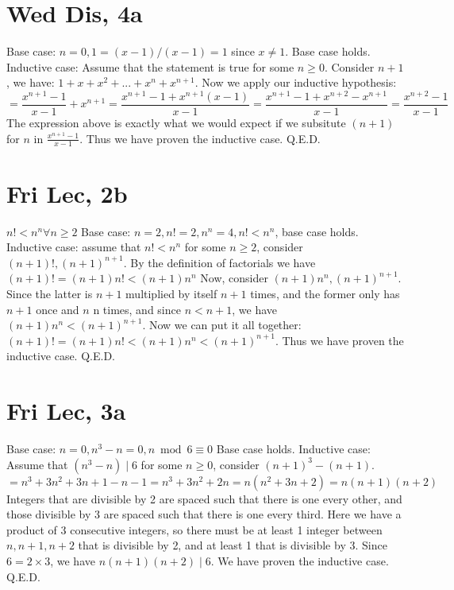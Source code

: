 \documentclass[12pt]{article}
\begin{document}
\section{Wed Dis, 4a}
Base case: $n = 0, 1 = (x-1)/(x-1) = 1$ since $x \neq 1$. Base case holds.
\newline
Inductive case: Assume that the statement is true for some $n \geq 0$. Consider $n+1$, we have: $1 + x + x^2 + ... + x^n + x^{n+1}$. Now we apply our inductive hypothesis:
$$= \frac{x^{n+1}-1}{x-1} + x^{n+1} = \frac{x^{n+1}-1+x^{n+1}(x-1)}{x-1} = \frac{x^{n+1}-1+x^{n+2}-x^{n+1}}{x-1} = \frac{x^{n+2}-1}{x-1}$$
The expression above is exactly what we would expect if we subsitute $(n+1)$ for $n$ in $\frac{x^{n+1}-1}{x-1}$. Thus we have proven the inductive case. Q.E.D.
\newpage


\section{Fri Lec, 2b}
$n! < n^n \forall n \geq 2$
\newline
Base case: $n=2, n!=2, n^n=4, n! < n^n$, base case holds.
\newline
Inductive case: assume that $n! < n^n$ for some $n \geq 2$, consider $(n+1)!, (n+1)^{n+1}$. By the definition of factorials we have $(n+1)! = (n+1)n! < (n+1)n^n$
\newline
Now, consider $(n+1)n^n, (n+1)^{n+1}$. Since the latter is $n+1$ multiplied by itself $n+1$ times, and the former only has $n+1$ once and $n$ n times, and since $n<n+1$, we have $(n+1)n^n < (n+1)^{n+1}$.
\newline
Now we can put it all together: $(n+1)! = (n+1)n! < (n+1)n^n < (n+1)^{n+1}$. Thus we have proven the inductive case. Q.E.D.

\section{Fri Lec, 3a}
Base case: $n = 0, n^3-n = 0, n \bmod 6 \equiv 0$ Base case holds.
\newline
Inductive case: Assume that $(n^3-n) \mid 6$ for some $n \geq 0$, consider $(n+1)^3-(n+1)$.
$$= n^3 + 3n^2 + 3n + 1 - n -1 = n^3+3n^2+2n = n(n^2+3n+2) = n(n+1)(n+2)$$
Integers that are divisible by 2 are spaced such that there is one every other, and those divisible by 3 are spaced such that there is one every third. Here we have a product of 3 consecutive integers, so there must be at least 1 integer between $n, n+1, n+2$ that is divisible by 2, and at least 1 that is divisible by 3. Since $6=2 \times 3$, we have $n(n+1)(n+2) \mid 6$.
\newline
We have proven the inductive case. Q.E.D.
\end{document}
